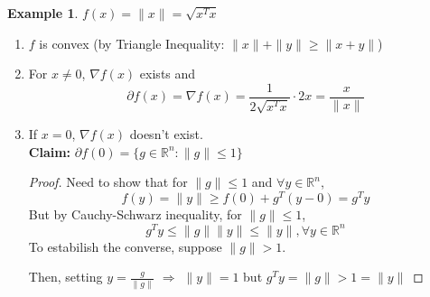 \documentclass[11pt,a4paper]{article}
\newtheorem{example}{Example}
\begin{document}
\begin{example}
    $f(x)=\|x\|=\sqrt{x^Tx}$
\end{example}
\begin{enumerate}[$\bullet$]
    \item $f$ is convex (by Triangle Inequality: $\|x\|+\|y\|\geq \|x+y\|$)
    \item For $x\neq 0$, $\nabla f(x)$ exists and $$\partial f(x)= \nabla f(x) =\frac{1}{2\sqrt{x^Tx}}\cdot 2x=\frac{x}{\|x\|}$$
    \item If $x=0$, $\nabla f(x)$ doesn't exist.\\
    \textbf{Claim:} $\partial f(0)=\{g\in \mathbb{R}^n:\|g\|\leq 1\}$
    \begin{proof}
        Need to show that for $\|g\|\leq 1$ and $\forall y\in \mathbb{R}^n$, $$f(y)=\|y\|\geq f(0)+g^T(y-0)=g^T y$$
        But by Cauchy-Schwarz inequality, for $\|g\|\leq 1$, $$g^Ty\leq \|g\|\|y\|\leq \|y\|,\forall y\in \mathbb{R}^n$$
        To estabilish the converse, suppose $\|g\|>1$.

        Then, setting $y=\frac{g}{\|g\|}$ $\Rightarrow$ $\|y\|=1$ but $g^Ty=\|g\|>1=\|y\|$
    \end{proof}
\end{enumerate}
\end{document}
